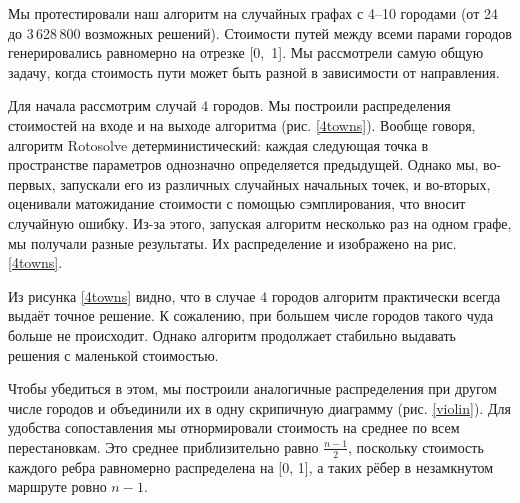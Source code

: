 


Мы протестировали наш алгоритм на случайных графах с 4--10 городами (от 24 до 3\,628\,800 возможных решений). 
Стоимости путей между всеми парами городов генерировались равномерно на отрезке [0,~1]. 
Мы рассмотрели самую общую задачу, когда стоимость пути может быть разной в зависимости от направления.


Для начала рассмотрим случай 4 городов. Мы построили распределения стоимостей на входе и на выходе алгоритма (рис. \ref{4towns}). 
Вообще говоря, алгоритм Rotosolve детерминистический: каждая следующая точка в пространстве параметров однозначно определяется предыдущей. Однако мы, во-первых, запускали его из различных случайных начальных точек, и во-вторых, оценивали матожидание стоимости с помощью сэмплирования, что вносит случайную ошибку. Из-за этого, запуская алгоритм несколько раз на одном графе, мы получали разные результаты. Их распределение и изображено на рис. \ref{4towns}.


Из рисунка \ref{4towns} видно, что в случае 4 городов алгоритм практически всегда выдаёт точное решение. К сожалению, при большем числе городов такого чуда больше не происходит. Однако алгоритм продолжает стабильно выдавать решения с маленькой стоимостью.

Чтобы убедиться в этом, мы построили аналогичные распределения 
при другом числе городов и объединили их в одну скрипичную диаграмму (рис. \ref{violin}). Для удобства сопоставления мы отнормировали стоимость на среднее по всем перестановкам. Это среднее приблизительно равно $\frac{n-1}{2}$, поскольку стоимость каждого ребра равномерно распределена на [0, 1], а таких рёбер в незамкнутом маршруте ровно $n-1$.


